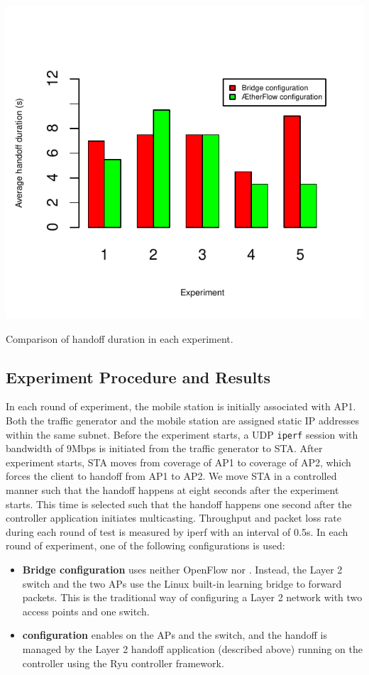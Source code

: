 \begin{table}
\centering
\includegraphics[width=.6\textwidth]{figures/duration}
\caption{Comparison of handoff duration in each experiment.}
\label{fig:duration}
\end{table}


\subsection{Experiment Procedure and Results}
In each round of experiment, the mobile station is initially associated with AP1. Both the traffic generator
and the mobile station are assigned static IP addresses within the same subnet. Before the experiment
starts, a UDP \texttt{iperf} session with bandwidth of 9Mbps is initiated from
the traffic generator to STA.  After experiment starts, STA moves from coverage
of AP1 to coverage of AP2, which forces the client to handoff from AP1 to AP2.
We move STA in a controlled manner such that the handoff happens at eight seconds
after the experiment starts. This time is selected such that the handoff happens
one second after the controller application initiates multicasting.  Throughput
and packet loss rate during each round of test is measured by iperf with an
interval of 0.5s. In each round of experiment, one of the following
configurations is used:
\begin{itemize}
\item {\bf Bridge configuration} uses neither OpenFlow nor \aetherflow. Instead,
the Layer 2 switch and the two APs use the Linux built-in learning bridge to
forward packets. This is the traditional way of configuring a Layer 2 network
with two access points and one switch. 
\item {\bf \aetherflow configuration} enables \aetherflow on the APs and the
switch, and the handoff is managed by the Layer 2 handoff application (described
above) running on the \aetherflow controller using the Ryu controller framework.  
\end{itemize}

